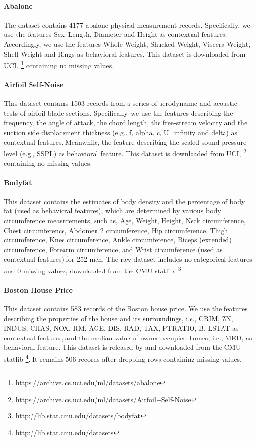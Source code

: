 \documentclass[pdflatex,sn-basic]{sn-jnl}%
\theoremstyle{thmstyleone}%
\theoremstyle{thmstyletwo}%
\theoremstyle{thmstylethree}%
\begin{document}
\begin{appendices}
\paragraph{Abalone} The dataset contains 4177 abalone physical measurement records. Specifically, we use the features Sex, Length, Diameter and Height as contextual features. Accordingly, we use the features Whole Weight, Shucked Weight, Viscera Weight, Shell Weight and Rings as behavioral features. This dataset is downloaded from UCI, \footnote{https://archive.ics.uci.edu/ml/datasets/abalone} containing no missing values.


\paragraph{Airfoil Self-Noise} This dataset contains 1503 records from a series of aerodynamic and acoustic tests of airfoil blade sections. Specifically, we use the features describing the frequency, the angle of attack, the chord length, the free-stream velocity and the suction side displacement thickness (e.g., f, alpha, c, U\_infinity and delta) as contextual features. Meanwhile, the feature describing the scaled sound pressure level (e.g., SSPL) as behavioral feature. This dataset is downloaded from UCI, \footnote{https://archive.ics.uci.edu/ml/datasets/Airfoil+Self-Noise} containing no missing values.

\paragraph{Bodyfat} This dataset contains the estimates of body density and 
the percentage of body fat (used as behavioral features), which are determined by various body circumference measurements, such as, Age, Weight, Height, Neck circumference, Chest circumference, Abdomen 2 circumference, Hip circumference, Thigh circumference, Knee circumference, Ankle circumference, Biceps (extended) circumference, Forearm circumference, and Wrist circumference (used as contextual features) for 252 men. The raw dataset includes no categorical features and 0 missing values, downloaded from the CMU statlib. \footnote{http://lib.stat.cmu.edu/datasets/bodyfat}


\paragraph{Boston House Price} This dataset contains 583 records of the Boston house price. We use the features describing the properties of the house and its surroundings, i.e., CRIM, ZN, INDUS, CHAS, NOX, RM, AGE, DIS, RAD, TAX, PTRATIO, B, LSTAT as contextual features, and the median value of owner-occupied homes, i.e., MED, as behavioral feature. This dataset is released by \cite{harrison1978hedonic} and downloaded from the CMU statlib \footnote{http://lib.stat.cmu.edu/datasets}. It remains 506 records after dropping rows containing missing values.


\end{appendices}
\end{document}
